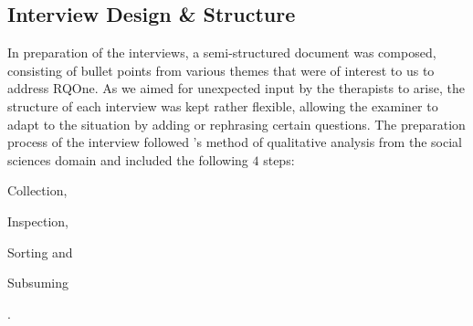 \subsection{Interview Design \& Structure}
In preparation of the interviews, a semi-structured document was composed, consisting of bullet points from various themes that were of interest to us %
to address \acl{RQOne}. As we aimed for unexpected input by the therapists to arise, the structure of each interview was kept rather flexible, allowing the examiner to adapt to the situation by adding or rephrasing certain questions. %
The preparation process of the interview followed \citeauthor{helfferich2009}'s method of qualitative analysis from the social sciences domain \cite{helfferich2009} and included the following $4$ steps:
\begin{enumerate*}
    \item Collection,
    \item Inspection,
    \item Sorting and
    \item Subsuming
\end{enumerate*}.
